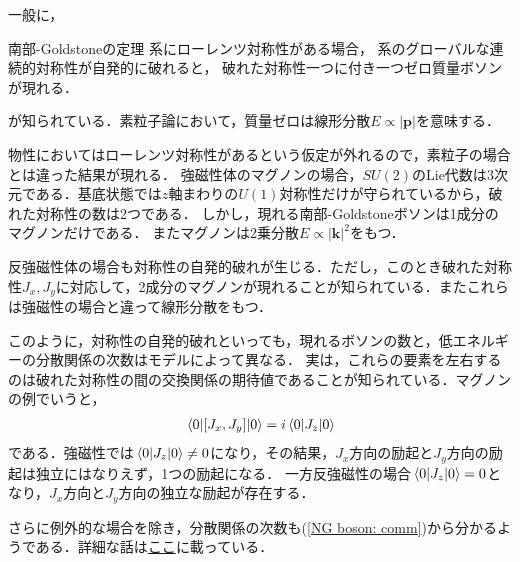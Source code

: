 \documentclass[../main.tex]{subfiles}
\begin{document}
\begin{frame}
    一般に，
    \begin{block}{南部-Goldstoneの定理}
        系にローレンツ対称性がある場合，
        系のグローバルな連続的対称性が自発的に破れると，
        破れた対称性一つに付き一つゼロ質量ボソンが現れる．
    \end{block}
    が知られている．素粒子論において，質量ゼロは線形分散$E \propto |\bm{p}|$を意味する．

    物性においてはローレンツ対称性があるという仮定が外れるので，素粒子の場合とは違った結果が現れる．
    強磁性体のマグノンの場合，$SU(2)$のLie代数は$3$次元である．基底状態では$z$軸まわりの$U(1)$対称性だけが守られているから，破れた対称性の数は2つである．
    しかし，現れる南部-Goldstoneボソンは\alert{1成分}のマグノンだけである．
    またマグノンは\alert{2乗分散}$E \propto |\bm{k}|^2$をもつ．
\end{frame}

\begin{frame}
    反強磁性体の場合も対称性の自発的破れが生じる．ただし，このとき破れた対称性$J_x, J_y$に対応して，\alert{2成分}のマグノンが現れることが知られている．またこれらは強磁性の場合と違って\alert{線形分散}をもつ．

    このように，対称性の自発的破れといっても，現れるボソンの数と，低エネルギーの分散関係の次数はモデルによって異なる．
    実は，これらの要素を左右するのは破れた対称性の間の交換関係の期待値であることが知られている．マグノンの例でいうと，
    \begin{align}
        \mel{0}{[J_x, J_y]}{0} = i \mel{0}{J_z}{0}
        \label{NG boson: comm}
    \end{align}
    である．強磁性では$\mel{0}{J_z}{0} \ne 0$になり，その結果，$J_x$方向の励起と$J_y$方向の励起は独立にはなりえず，1つの励起になる．
    一方反強磁性の場合$\mel{0}{J_z}{0} = 0$となり，$J_x$方向と$J_y$方向の独立な励起が存在する．

    さらに例外的な場合を除き，分散関係の次数も(\ref{NG boson: comm})から分かるようである．詳細な話は\href{https://www.jstage.jst.go.jp/article/butsuri/68/4/68_KJ00008636350/_article/-char/ja/}{ここ}に載っている．
\end{frame}
\end{document}
